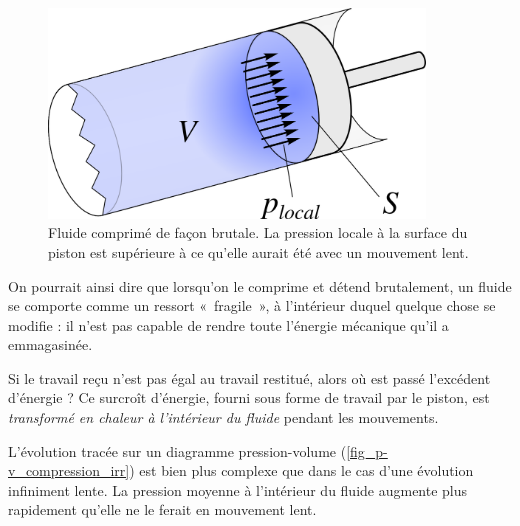 		\begin{figure}
			\begin{center}
				\includegraphics[width=10cm]{images/travail_cylindre_3.png}
			\end{center}
			\caption{Fluide comprimé de façon brutale. La pression locale à la surface du piston est supérieure à ce qu’elle aurait été avec un mouvement lent.}
			\label{fig_piston_fluide_rapide}
		\end{figure}

		On pourrait ainsi dire que lorsqu’on le comprime et détend brutalement, un fluide se comporte comme un ressort «~fragile~», à l’intérieur duquel quelque chose se modifie : il n’est pas capable de rendre toute l’énergie mécanique qu’il a emmagasinée.

		Si le travail reçu n’est pas égal au travail restitué, alors où est passé l’excédent d’énergie ? Ce surcroît d’énergie, fourni sous forme de travail par le piston, est \emph{transformé en chaleur à l’intérieur du fluide} pendant les mouvements. 

		\clearfloats %

		L’évolution tracée sur un diagramme pression-volume (\cref{fig_p-v_compression_irr}) est bien plus complexe que dans le cas d’une évolution infiniment lente. La pression moyenne à l’intérieur du fluide augmente plus rapidement qu’elle ne le ferait en mouvement lent.

